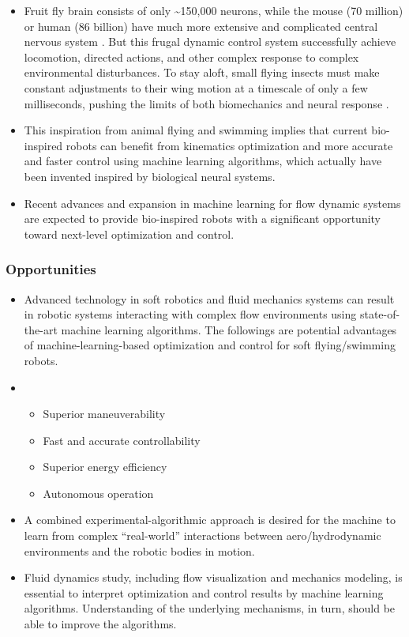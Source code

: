 \documentclass[12pt, a4paper]{article}
\providecommand{\tightlist}{%
  \setlength{\itemsep}{0pt}\setlength{\parskip}{0pt}}
\begin{document}
\begin{itemize}
\tightlist
\item
  Fruit fly brain consists of only \textasciitilde150,000 neurons, while
  the mouse (70 million) or human (86 billion) have much more extensive
  and complicated central nervous system \citep{Webb2020}. But this
  frugal dynamic control system successfully achieve locomotion,
  directed actions, and other complex response to complex environmental
  disturbances. To stay aloft, small flying insects must make constant
  adjustments to their wing motion at a timescale of only a few
  milliseconds, pushing the limits of both biomechanics and neural
  response \citep{Cohen2019}.
\item
  This inspiration from animal flying and swimming implies that current
  bio-inspired robots can benefit from kinematics optimization and more
  accurate and faster control using machine learning algorithms, which
  actually have been invented inspired by biological neural systems.
\item
  Recent advances and expansion in machine learning for flow dynamic
  systems are expected to provide bio-inspired robots with a significant
  opportunity toward next-level optimization and control.
\end{itemize}

\hypertarget{opportunities-1}{%
\subsubsection{Opportunities}\label{opportunities-1}}

\begin{itemize}
\item
  Advanced technology in soft robotics and fluid mechanics systems can
  result in robotic systems interacting with complex flow environments
  using state-of-the-art machine learning algorithms. The followings are
  potential advantages of machine-learning-based optimization and
  control for soft flying/swimming robots.
\item
  \begin{itemize}
  \tightlist
  \item
    Superior maneuverability
  \item
    Fast and accurate controllability
  \item
    Superior energy efficiency
  \item
    Autonomous operation
  \end{itemize}
\item
  A combined experimental-algorithmic approach is desired for the
  machine to learn from complex ``real-world'' interactions between
  aero/hydrodynamic environments and the robotic bodies in motion.
\item
  Fluid dynamics study, including flow visualization and mechanics
  modeling, is essential to interpret optimization and control results
  by machine learning algorithms. Understanding of the underlying
  mechanisms, in turn, should be able to improve the algorithms.
\end{itemize}
\end{document}
